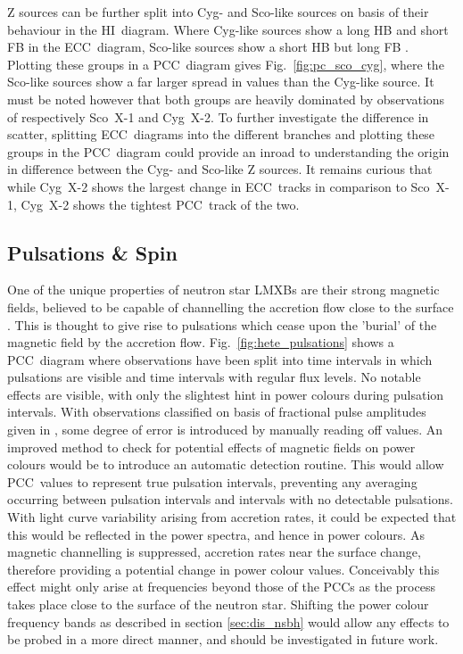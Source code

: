 Z sources can be further split into Cyg- and Sco-like sources on basis of their behaviour in the \ac{HI}~diagram. Where Cyg-like sources show a long \ac{HB} and short \ac{FB} in the \ac{ECC}~diagram, Sco-like sources show a short \ac{HB} but long \ac{FB} \citep{kuulkers1995detection,homan2007rossi}. Plotting these groups in a \ac{PCC}~diagram gives Fig.~\ref{fig:pc_sco_cyg}, where the Sco-like sources show a far larger spread in values than the Cyg-like source. It must be noted however that both groups are heavily dominated by observations of respectively Sco~X-1 and Cyg~X-2. To further investigate the difference in scatter, splitting \ac{ECC}~diagrams into the different branches and plotting these groups in the \ac{PCC}~diagram could provide an inroad to understanding the origin in difference between the Cyg- and Sco-like Z sources. It remains curious that while Cyg~X-2 shows the largest change in \ac{ECC}~tracks in comparison to Sco~X-1, Cyg~X-2 shows the tightest \ac{PCC}~track of the two.\\

\subsection{Pulsations \& Spin}
\label{sec:dis_ps}
One of the unique properties of neutron star \acp{LMXB} are their strong magnetic fields, believed to be capable of channelling the accretion flow close to the surface \citep[see][]{cumming2001magnetic,payne2006magnetic}. This is thought to give rise to pulsations which cease upon the 'burial' of the magnetic field by the accretion flow. Fig.~\ref{fig:hete_pulsations} shows a \ac{PCC}~diagram where observations have been split into time intervals in which pulsations are visible and time intervals with regular flux levels. No notable effects are visible, with only the slightest hint in power colours during pulsation intervals. With observations classified on basis of fractional pulse amplitudes given in \citet{galloway2006intermittent}, some degree of error is introduced by manually reading off values. An improved method to check for potential effects of magnetic fields on power colours would be to introduce an automatic detection routine. This would allow \ac{PCC}~values to represent true pulsation intervals, preventing any averaging occurring between pulsation intervals and intervals with no detectable pulsations. With light curve variability arising from accretion rates, it could be expected that this would be reflected in the power spectra, and hence in power colours. As magnetic channelling is suppressed, accretion rates near the surface change, therefore providing a potential change in power colour values. Conceivably this effect might only arise at frequencies beyond those of the \acp{PCC} as the process takes place close to the surface of the neutron star. Shifting the power colour frequency bands as described in section \ref{sec:dis_nsbh} would allow any effects to be probed in a more direct manner, and should be investigated in future work.\\

